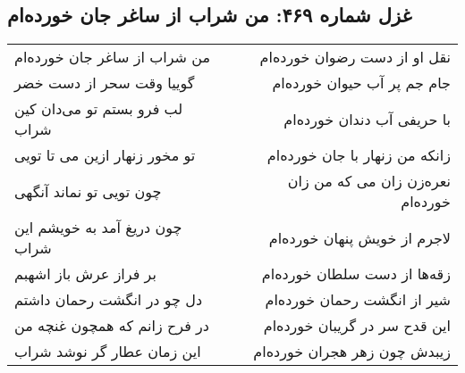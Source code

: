 \begin{center}
\section*{غزل شماره ۴۶۹: من شراب از ساغر جان خورده‌ام}
\label{sec:469}
\begin{longtable}{l p{0.5cm} r}
من شراب از ساغر جان خورده‌ام
&&
نقل او از دست رضوان خورده‌ام
\\
گوییا وقت سحر از دست خضر
&&
جام جم پر آب حیوان خورده‌ام
\\
لب فرو بستم تو می‌دان کین شراب
&&
با حریفی آب دندان خورده‌ام
\\
تو مخور زنهار ازین می تا تویی
&&
زانکه من زنهار با جان خورده‌ام
\\
چون تویی تو نماند آنگهی
&&
نعره‌زن زان می که من زان خورده‌ام
\\
چون دریغ آمد به خویشم این شراب
&&
لاجرم از خویش پنهان خورده‌ام
\\
بر فراز عرش باز اشهبم
&&
زقه‌ها از دست سلطان خورده‌ام
\\
دل چو در انگشت رحمان داشتم
&&
شیر از انگشت رحمان خورده‌ام
\\
در فرح زانم که همچون غنچه من
&&
این قدح سر در گریبان خورده‌ام
\\
این زمان عطار گر نوشد شراب
&&
زیبدش چون زهر هجران خورده‌ام
\\
\end{longtable}
\end{center}
